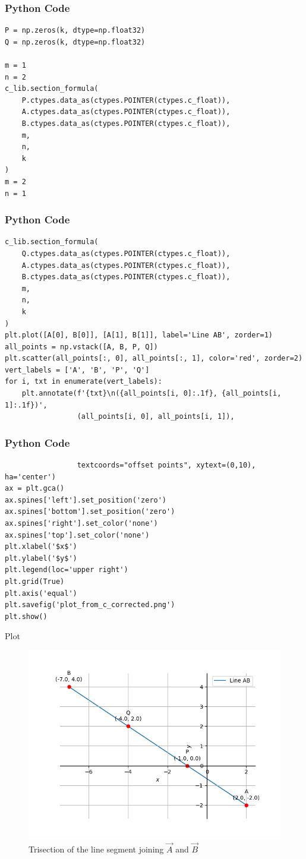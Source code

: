 \documentclass{beamer}
\begin{document}
\begin{frame}[fragile]
    \frametitle{Python Code}
    \begin{lstlisting}
P = np.zeros(k, dtype=np.float32)
Q = np.zeros(k, dtype=np.float32)

m = 1
n = 2
c_lib.section_formula(
    P.ctypes.data_as(ctypes.POINTER(ctypes.c_float)),
    A.ctypes.data_as(ctypes.POINTER(ctypes.c_float)),
    B.ctypes.data_as(ctypes.POINTER(ctypes.c_float)),
    m,
    n,
    k
)
m = 2
n = 1
    \end{lstlisting}
\end{frame}


\begin{frame}[fragile]
    \frametitle{Python Code}
    \begin{lstlisting}
c_lib.section_formula(
    Q.ctypes.data_as(ctypes.POINTER(ctypes.c_float)), 
    A.ctypes.data_as(ctypes.POINTER(ctypes.c_float)),
    B.ctypes.data_as(ctypes.POINTER(ctypes.c_float)),
    m,
    n,
    k
)
plt.plot([A[0], B[0]], [A[1], B[1]], label='Line AB', zorder=1)
all_points = np.vstack([A, B, P, Q])
plt.scatter(all_points[:, 0], all_points[:, 1], color='red', zorder=2)
vert_labels = ['A', 'B', 'P', 'Q']
for i, txt in enumerate(vert_labels):
    plt.annotate(f'{txt}\n({all_points[i, 0]:.1f}, {all_points[i, 1]:.1f})',
                 (all_points[i, 0], all_points[i, 1]),

    \end{lstlisting}
\end{frame}


\begin{frame}[fragile]
    \frametitle{Python Code}
    \begin{lstlisting}
                 textcoords="offset points", xytext=(0,10), ha='center')
ax = plt.gca()
ax.spines['left'].set_position('zero')
ax.spines['bottom'].set_position('zero')
ax.spines['right'].set_color('none')
ax.spines['top'].set_color('none')
plt.xlabel('$x$')
plt.ylabel('$y$')
plt.legend(loc='upper right')
plt.grid(True)
plt.axis('equal')
plt.savefig('plot_from_c_corrected.png')
plt.show()
    \end{lstlisting}
\end{frame}



\begin{frame}{Plot}
    \begin{figure}
        \centering
        \includegraphics[width=0.5\columnwidth]{../figs/Plot_C.png}
        \caption{Trisection of the line segment joining $\vec{A}$  and $\vec{B}$ }
        \label{fig:fig}
    \end{figure}
\end{frame}
\end{document}
